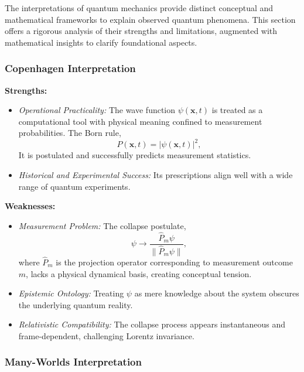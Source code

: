 \documentclass[12pt]{article}
\begin{document}
The interpretations of quantum mechanics provide distinct conceptual and mathematical frameworks to explain observed quantum phenomena. This section offers a rigorous analysis of their strengths and limitations, augmented with mathematical insights to clarify foundational aspects.

\subsubsection*{Copenhagen Interpretation}

\textbf{Strengths:}
\begin{itemize}
    \item \emph{Operational Practicality:} The wave function $\psi(\mathbf{x},t)$ is treated as a computational tool with physical meaning confined to measurement probabilities. The Born rule,
    \begin{equation}
        P(\mathbf{x}, t) = |\psi(\mathbf{x}, t)|^{2},
        \label{eq:born_rule}
    \end{equation}
    It is postulated and successfully predicts measurement statistics.
    \item \emph{Historical and Experimental Success:} Its prescriptions align well with a wide range of quantum experiments.
\end{itemize}

\textbf{Weaknesses:}
\begin{itemize}
    \item \emph{Measurement Problem:} The collapse postulate,
    \begin{equation}
        \psi \rightarrow \frac{\hat{P}_{m}\psi}{\|\hat{P}_{m}\psi\|},
        \label{eq:collapse_postulate}
    \end{equation}
    where $\hat{P}_m$ is the projection operator corresponding to measurement outcome $m$, lacks a physical dynamical basis, creating conceptual tension.
    \item \emph{Epistemic Ontology:} Treating $\psi$ as mere knowledge about the system obscures the underlying quantum reality.
    \item \emph{Relativistic Compatibility:} The collapse process appears instantaneous and frame-dependent, challenging Lorentz invariance.
\end{itemize}

\subsubsection*{Many-Worlds Interpretation}
\end{document}
